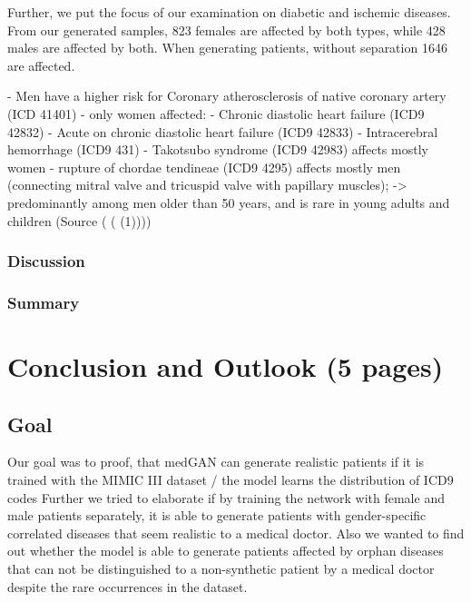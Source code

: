 \documentclass[11pt, a4paper]{book}
\begin{document}
Further, we put the focus of our examination on diabetic and ischemic diseases. 
From our generated samples, 823 females are affected by both types, while 428 males are affected by both. When generating patients, without separation 1646 are affected.

- Men have a higher risk for  Coronary atherosclerosis of native coronary artery (ICD 41401)
- only women affected:
  - Chronic diastolic heart failure (ICD9 42832)
  - Acute on chronic diastolic heart failure  (ICD9 42833)
  - Intracerebral hemorrhage (ICD9 431)
- Takotsubo syndrome (ICD9 42983) affects mostly women
- rupture of chordae tendineae (ICD9 4295) affects mostly men (connecting mitral valve and tricuspid valve with papillary muscles); 
  -> predominantly among men older than 50 years, and is rare in young adults and children (Source ( ( (1))))


\subsection{Discussion}

\subsection{Summary}

\chapter{Conclusion and Outlook (5 pages)}
\section{Goal}
Our goal was to proof, that medGAN can generate realistic patients if it is trained with the MIMIC III dataset / the model learns the distribution of ICD9 codes 
Further we tried to elaborate if by training the network with female and male patients separately, it is able to generate patients with gender-specific correlated diseases that seem realistic to a medical doctor.
Also we wanted to find out whether the model is able to generate patients affected by orphan diseases that can not be distinguished to a non-synthetic patient by a medical doctor despite the rare occurrences in the dataset.
\end{document}
